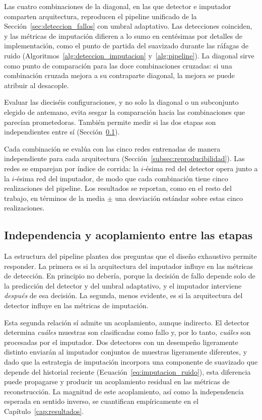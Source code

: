 \documentclass{report}
\begin{document}
Las cuatro combinaciones de la diagonal, en las que detector e imputador comparten arquitectura, reproducen el pipeline unificado de la Sección~\ref{sec:deteccion_fallos} con umbral adaptativo. Las detecciones coinciden, y las métricas de imputación difieren a lo sumo en centésimas por detalles de implementación, como el punto de partida del suavizado durante las ráfagas de ruido (Algoritmos~\ref{alg:deteccion_imputacion} y~\ref{alg:pipeline}). La diagonal sirve como punto de comparación para las doce combinaciones cruzadas: si una combinación cruzada mejora a su contraparte diagonal, la mejora se puede atribuir al desacople.

Evaluar las dieciséis configuraciones, y no solo la diagonal o un subconjunto elegido de antemano, evita sesgar la comparación hacia las combinaciones que parecían prometedoras. También permite medir si las dos etapas son independientes entre sí (Sección~\ref{subsec:acoplamiento_pipeline}).

Cada combinación se evalúa con las cinco redes entrenadas de manera independiente para cada arquitectura (Sección~\ref{subsec:reproducibilidad}). Las redes se emparejan por índice de corrida: la $i$-ésima red del detector opera junto a la $i$-ésima red del imputador, de modo que cada combinación tiene cinco realizaciones del pipeline. Los resultados se reportan, como en el resto del trabajo, en términos de la media $\pm$ una desviación estándar sobre estas cinco realizaciones.

\subsection{Independencia y acoplamiento entre las etapas}
\label{subsec:acoplamiento_pipeline}

La estructura del pipeline plantea dos preguntas que el diseño exhaustivo permite responder. La primera es si la arquitectura del imputador influye en las métricas de detección. En principio no debería, porque la decisión de fallo depende solo de la predicción del detector y del umbral adaptativo, y el imputador interviene \textit{después} de esa decisión. La segunda, menos evidente, es si la arquitectura del detector influye en las métricas de imputación.

Esta segunda relación sí admite un acoplamiento, aunque indirecto. El detector determina \textit{cuáles} muestras son clasificadas como fallo y, por lo tanto, \textit{cuáles} son procesadas por el imputador. Dos detectores con un desempeño ligeramente distinto enviarán al imputador conjuntos de muestras ligeramente diferentes, y dado que la estrategia de imputación incorpora una componente de suavizado que depende del historial reciente (Ecuación~\eqref{eq:imputacion_ruido}), esta diferencia puede propagarse y producir un acoplamiento residual en las métricas de reconstrucción. La magnitud de este acoplamiento, así como la independencia esperada en sentido inverso, se cuantifican empíricamente en el Capítulo~\ref{cap:resultados}.
\end{document}
